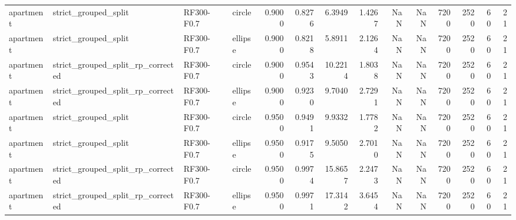 \begin{tabular}{llllrrrrrrrrrr}
apartment & strict\_grouped\_split & RF300-F0.7 & circle & 0.9000 & 0.8276 & 6.3949 & 1.4267 & NaN & NaN & 7200 & 2520 & 60 & 21 \\
apartment & strict\_grouped\_split & RF300-F0.7 & ellipse & 0.9000 & 0.8218 & 5.8911 & 2.1264 & NaN & NaN & 7200 & 2520 & 60 & 21 \\
apartment & strict\_grouped\_split\_rp\_corrected & RF300-F0.7 & circle & 0.9000 & 0.9543 & 10.2214 & 1.8038 & NaN & NaN & 7200 & 2520 & 60 & 21 \\
apartment & strict\_grouped\_split\_rp\_corrected & RF300-F0.7 & ellipse & 0.9000 & 0.9230 & 9.7040 & 2.7291 & NaN & NaN & 7200 & 2520 & 60 & 21 \\
apartment & strict\_grouped\_split & RF300-F0.7 & circle & 0.9500 & 0.9491 & 9.9332 & 1.7782 & NaN & NaN & 7200 & 2520 & 60 & 21 \\
apartment & strict\_grouped\_split & RF300-F0.7 & ellipse & 0.9500 & 0.9175 & 9.5050 & 2.7010 & NaN & NaN & 7200 & 2520 & 60 & 21 \\
apartment & strict\_grouped\_split\_rp\_corrected & RF300-F0.7 & circle & 0.9500 & 0.9974 & 15.8657 & 2.2473 & NaN & NaN & 7200 & 2520 & 60 & 21 \\
apartment & strict\_grouped\_split\_rp\_corrected & RF300-F0.7 & ellipse & 0.9500 & 0.9971 & 17.3142 & 3.6454 & NaN & NaN & 7200 & 2520 & 60 & 21 \\
\bottomrule
\end{tabular}
